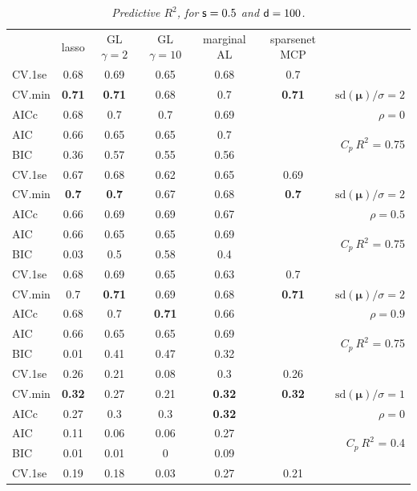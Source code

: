\documentclass[12pt]{article}
\newcommand{\mr}[1]{\mathrm{#1}}
\newcommand{\bm}[1]{\mathbf{#1}}
\begin{document}
\begin{table}[p]\vspace{-.5cm}
\caption[l]{\it Predictive $R^2$, for ${\sf s}=0.5$ and  ${\sf d}=100$.}
\vspace{-.5cm}
\small{}
\begin{center}
\begin{tabular}{l*{5}{c}|r}
 & lasso & GL $\gamma=2$ & GL $\gamma=10$ & marginal AL & sparsenet MCP  &  \\
\cline{1-7}
CV.1se & 0.68 & 0.69 & 0.65 & 0.68 & 0.7 &\\
CV.min & {\bf 0.71} & {\bf 0.71} & 0.68 & 0.7 & {\bf 0.71} &  $\mr{sd}(\bm{\mu})/\sigma=2$ \\
AICc & 0.68 & 0.7 & 0.7 & 0.69 & & $\rho=0$ \\
AIC & 0.66 & 0.65 & 0.65 & 0.7 & & \multirow{2}{*}{$C_p ~ R^2$ = 0.75} \\
BIC & 0.36 & 0.57 & 0.55 & 0.56 & & \\
 \hline 
CV.1se & 0.67 & 0.68 & 0.62 & 0.65 & 0.69 &\\
CV.min & {\bf 0.7} & {\bf 0.7} & 0.67 & 0.68 & {\bf 0.7} &  $\mr{sd}(\bm{\mu})/\sigma=2$ \\
AICc & 0.66 & 0.69 & 0.69 & 0.67 & & $\rho=0.5$ \\
AIC & 0.66 & 0.65 & 0.65 & 0.69 & & \multirow{2}{*}{$C_p ~ R^2$ = 0.75} \\
BIC & 0.03 & 0.5 & 0.58 & 0.4 & & \\
 \hline 
CV.1se & 0.68 & 0.69 & 0.65 & 0.63 & 0.7 &\\
CV.min & 0.7 & {\bf 0.71} & 0.69 & 0.68 & {\bf 0.71} &  $\mr{sd}(\bm{\mu})/\sigma=2$ \\
AICc & 0.68 & 0.7 & {\bf 0.71} & 0.66 & & $\rho=0.9$ \\
AIC & 0.66 & 0.65 & 0.65 & 0.69 & & \multirow{2}{*}{$C_p ~ R^2$ = 0.75} \\
BIC & 0.01 & 0.41 & 0.47 & 0.32 & & \\
 \hline 
CV.1se & 0.26 & 0.21 & 0.08 & 0.3 & 0.26 &\\
CV.min & {\bf 0.32} & 0.27 & 0.21 & {\bf 0.32} & {\bf 0.32} &  $\mr{sd}(\bm{\mu})/\sigma=1$ \\
AICc & 0.27 & 0.3 & 0.3 & {\bf 0.32} & & $\rho=0$ \\
AIC & 0.11 & 0.06 & 0.06 & 0.27 & & \multirow{2}{*}{$C_p ~ R^2$ = 0.4} \\
BIC & 0.01 & 0.01 & 0 & 0.09 & & \\
 \hline 
CV.1se & 0.19 & 0.18 & 0.03 & 0.27 & 0.21 &\\

\end{tabular}
\end{center}
\end{table}
\end{document}

